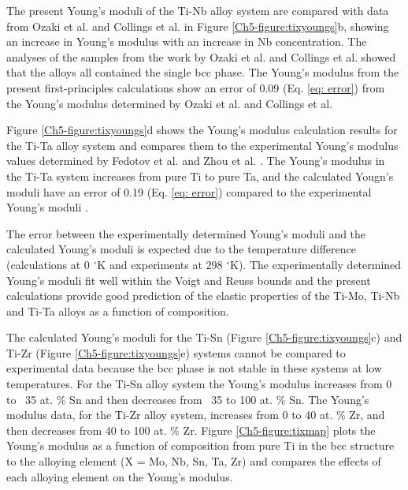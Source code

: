 The present Young's moduli of the Ti-Nb alloy system are compared with data from Ozaki et al. \cite{Ozaki2004} and Collings et al. \cite{Boyer1994} in Figure \ref{Ch5-figure:tixyoungs}b, showing an increase in Young's modulus with an increase in Nb concentration. The analyses of the samples from the work by Ozaki et al. and Collings et al. showed that the alloys all contained the single bcc phase. The Young's modulus from the present first-principles calculations show an error of 0.09 (Eq. \ref{eq: error}) from the Young's modulus determined by Ozaki et al. and Collings et al. 

Figure \ref{Ch5-figure:tixyoungs}d shows the Young's modulus calculation results for the Ti-Ta alloy system and compares them to the experimental Young's modulus values determined by Fedotov et al. \cite{Fedotov1985} and Zhou et al. \cite{Zhou2004a,Zhou2009a}. The Young's modulus in the Ti-Ta system increases from pure Ti to pure Ta, and the calculated Yougn's moduli have an error of 0.19 (Eq. \ref{eq: error}) compared to the experimental Young's moduli \cite{Fedotov1985,Zhou2004a,Zhou2009a}. 

The error between the experimentally determined Young's moduli and the calculated Young's moduli is expected due to the temperature difference (calculations at 0 $^{\circ}$K and experiments at 298 $^{\circ}$K). The experimentally determined Young's moduli fit well within the Voigt and Reuss bounds and the present calculations provide good prediction of the elastic properties of the Ti-Mo, Ti-Nb and Ti-Ta alloys as a function of composition.

The calculated Young's moduli for the Ti-Sn (Figure \ref{Ch5-figure:tixyoungs}c) and Ti-Zr (Figure \ref{Ch5-figure:tixyoungs}e)  systems cannot be compared to experimental data because the bcc phase is not stable in these systems at low temperatures. For the Ti-Sn alloy system the Young's modulus increases from 0  to ~35 at. \% Sn and then decreases from ~35 to 100 at. \% Sn. The Young's modulus data, for the Ti-Zr alloy system, increases from 0 to 40 at. \% Zr, and then decreases from 40 to 100 at. \% Zr. Figure \ref{Ch5-figure:tixmap} plots the Young's modulus as a function of composition from pure Ti in the bcc structure to the alloying element (X = Mo, Nb, Sn, Ta, Zr) and compares the effects of each alloying element on the Young's modulus.

